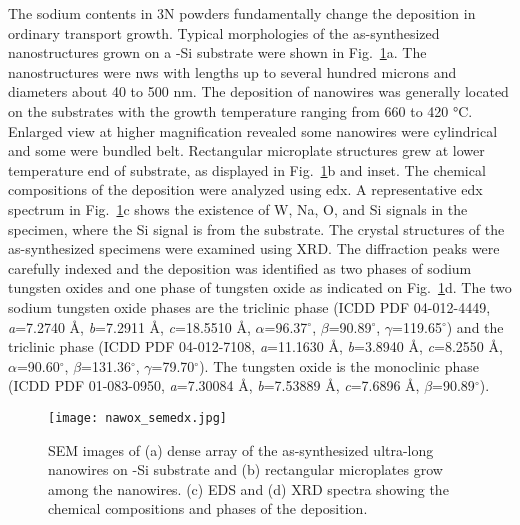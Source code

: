 The sodium contents in 3N powders fundamentally change the deposition in ordinary transport growth. Typical morphologies of the as-synthesized nanostructures grown on a -Si substrate were shown in Fig.~\ref{fig:nawoxsemedx}a. The nanostructures were \glspl{nw} with lengths up to several hundred microns and diameters about 40 to 500 nm. The deposition of nanowires was generally located on the substrates with the growth temperature ranging from 660 to 420 \si{\degreeCelsius}. Enlarged view at higher magnification revealed some nanowires were cylindrical and some were bundled belt. Rectangular microplate structures grew at lower temperature end of substrate, as displayed in Fig.~\ref{fig:nawoxsemedx}b and inset. The chemical compositions of the deposition were analyzed using \gls{edx}. A representative \gls{edx} spectrum in Fig.~\ref{fig:nawoxsemedx}c shows the existence of W, Na, O, and Si signals in the specimen, where the Si signal is from the substrate. The crystal structures of the as-synthesized specimens were examined using XRD. The diffraction peaks were carefully indexed and the deposition was identified as two phases of sodium tungsten oxides and one phase of tungsten oxide as indicated on Fig.~\ref{fig:nawoxsemedx}d. The two sodium tungsten oxide phases are the triclinic  phase (ICDD PDF 04-012-4449, \emph{a}=7.2740 \si{\angstrom}, \emph{b}=7.2911 \si{\angstrom}, \emph{c}=18.5510 \si{\angstrom}, $\alpha$=96.37$^\circ$, $\beta$=90.89$^\circ$, $\gamma$=119.65$^\circ$) and the triclinic  phase (ICDD PDF 04-012-7108, \emph{a}=11.1630 \si{\angstrom}, \emph{b}=3.8940 \si{\angstrom}, \emph{c}=8.2550 \si{\angstrom}, $\alpha$=90.60$^\circ$, $\beta$=131.36$^\circ$, $\gamma$=79.70$^\circ$). The tungsten oxide is the monoclinic  phase (ICDD PDF 01-083-0950, \emph{a}=7.30084 \si{\angstrom}, \emph{b}=7.53889 \si{\angstrom}, \emph{c}=7.6896 \si{\angstrom}, $\beta$=90.89$^\circ$).

\begin{figure}[htb]
\centering
\texttt{[image: nawox\_semedx.jpg]}
\caption[SEM, EDX and XRD on sodium tungsten oxides sample]{SEM images of (a) dense array of the as-synthesized ultra-long nanowires on -Si substrate and (b) rectangular microplates grow among the nanowires. (c) EDS and (d) XRD spectra showing the chemical compositions and phases of the deposition.}
\label{fig:nawoxsemedx}
\end{figure}

